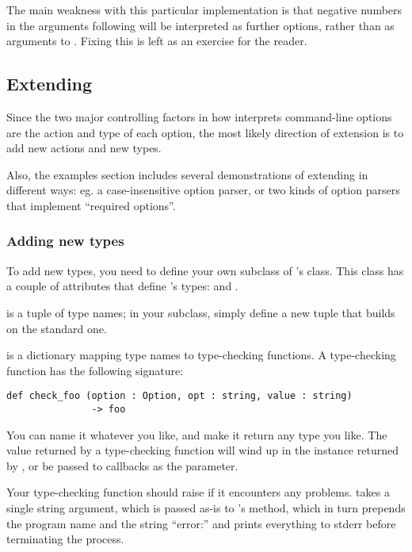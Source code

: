 The main weakness with this particular implementation is that negative
numbers in the arguments following  will be interpreted
as further options, rather than as arguments to .
Fixing this is left as an exercise for the reader.

\subsection{Extending \label{optparse-extending}}

Since the two major controlling factors in how 
interprets command-line options are the action and type of each
option, the most likely direction of extension is to add new actions
and new types.

Also, the examples section includes several demonstrations of
extending  in different ways: eg. a case-insensitive
option parser, or two kinds of option parsers that implement
``required options''.

\subsubsection{Adding new types\label{optparse-adding-types}}

To add new types, you need to define your own subclass of
's  class.  This class has a couple of
attributes that define 's types:  and
.

 is a tuple of type names; in your subclass, simply
define a new tuple  that builds on the standard one.

 is a dictionary mapping type names to
type-checking functions.  A type-checking function has the following
signature:

\begin{verbatim}
def check_foo (option : Option, opt : string, value : string)
               -> foo
\end{verbatim}

You can name it whatever you like, and make it return any type you
like.  The value returned by a type-checking function will wind up in
the  instance returned by
, or be passed to callbacks as the
 parameter.

Your type-checking function should raise 
if it encounters any problems.   takes a
single string argument, which is passed as-is to
's  method, which in turn prepends
the program name and the string ``error:'' and prints everything to
stderr before terminating the process.

